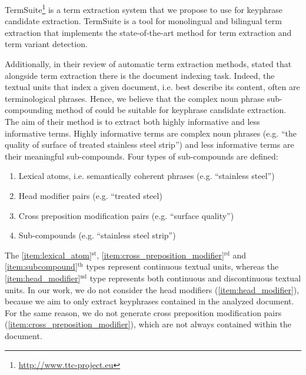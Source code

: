   TermSuite\footnote{\url{http://www.ttc-project.eu}} is a term extraction
  system that we propose to use for keyphrase candidate extraction. TermSuite is
  a tool for monolingual and bilingual term extraction that implements the
  state-of-the-art method for term extraction and term variant detection.

  Additionally, in their review of automatic term extraction methods,
   stated that alongside term
  extraction there is the document indexing task. Indeed, the textual units that
  index a given document, i.e. best describe its content, often are
  terminological phrases. Hence, we believe that the complex noun phrase
  sub-compounding method of  could be
  suitable for keyphrase candidate extraction. The aim of their method is to
  extract both highly informative and less informative terms. Highly informative
  terms are complex noun phrases (e.g. ``the quality of surface of treated
  stainless steel strip'') and less  informative terms are their meaningful
  sub-compounds. Four types of sub-compounds are defined:
  \begin{enumerate}
    \item{Lexical atoms, i.e. semantically coherent phrases (e.g. ``stainless
          steel'')
          \label{item:lexical_atom}}
    \item{Head modifier pairs (e.g. ``treated steel)
          \label{item:head_modifier}}
    \item{Cross preposition modification pairs (e.g. ``surface quality'')
          \label{item:cross_preposition_modifier}}
    \item{Sub-compounds (e.g. ``stainless steel strip'')
          \label{item:subcompound}}
  \end{enumerate}
  The \ref{item:lexical_atom}$^\text{st}$,
  \ref{item:cross_preposition_modifier}$^\text{rd}$ and
  \ref{item:subcompound}$^\text{th}$ types represent continuous textual units,
  whereas the \ref{item:head_modifier}$^\text{nd}$ type represents both
  continuous and discontinuous textual units. In our work, we do not consider
  the head modifiers (\ref{item:head_modifier}), because we aim to only extract
  keyphrases contained in the analyzed document. For the same reason, we do not
  generate cross preposition modification pairs
  (\ref{item:cross_preposition_modifier}), which are not always contained within
  the document.

